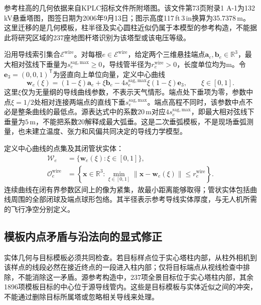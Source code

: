 参考柱高的几何依据来自KPLC招标文件所附塔图\cite{KPLC2025}。该文件第73页附录1 A-1为132\,kV悬垂塔图，图签日期为2006年9月13日；图示高度117\,ft\,3\,in换算为35.7378\,m。这里迁移的是几何模板，柱半径及实心圆柱近似仍属于本模型的参考构造，不能据此将研究区域的237座地图杆塔识别为该塔型或该电压等级。

沿用导线索引集合$\mathcal E^{\mathrm{wire}}$。对每根$e\in\mathcal E^{\mathrm{wire}}$，给定两个三维悬挂端点$\mathbf a_e,\mathbf b_e\in\mathbb R^3$，最大相对弦线下垂量为$s_e^{\mathrm{sag,max}}\ge0$，导线管半径为$r_e^{\mathrm{wire}}>0$，长度单位均为$\mathrm m$。令$\mathbf e_3=(0,0,1)^{\mathsf T}$为竖直向上单位向量，定义中心曲线
\begin{equation}
 \mathbf w_e(\xi)
 =(1-\xi)\mathbf a_e+\xi\mathbf b_e
 -4s_e^{\mathrm{sag,max}}\xi(1-\xi)\mathbf e_3,
 \qquad \xi\in[0,1].
 \label{s0406:wire_curve}
\end{equation}
这里$\xi$仅为无量纲的导线曲线参数，不表示天气情形。端点处下垂项为零，参数中点$\xi=1/2$处相对连接两端点的直线下垂$s_e^{\mathrm{sag,max}}$。端点高程不同时，该参数中点不必是整条曲线的最低点。源表达式中的系数$20\,\mathrm m$对应$4s_e^{\mathrm{sag,max}}$，即最大相对弦线下垂量为$5\,\mathrm m$，不能把系数20解释成最大弧垂。这是二次垂弧模板，不是现场垂弧测量，也未建立温度、张力和风偏共同决定的导线力学模型。

定义中心曲线的点集及其闭管状实体：
\begin{equation}
 \begin{split}
 \mathcal W_e&=\{\mathbf w_e(\xi):\xi\in[0,1]\},\\
 \mathcal O_e^{\mathrm{wire}}
 &=\left\{\mathbf x\in\mathbb R^3:
    \min_{\xi\in[0,1]}\|\mathbf x-\mathbf w_e(\xi)\|
       \le r_e^{\mathrm{wire}}\right\}.
 \end{split}
 \label{s0406:wire_tube}
\end{equation}
连续曲线在闭有界参数区间上的像为紧集，故最小距离能够取得；管状实体包括曲线周围的全部闭球及端点球形包络。其半径表示参考导线实体厚度，与无人机所需的飞行净空分别定义。

\subsection{模板内点矛盾与沿法向的显式修正}

实体几何与目标模板必须共同检查。若目标样点位于实心塔柱内部，从柱外相机到该样点的线段必然在接近终点的一段进入柱内部；仅将目标端点从视线检查中排除，不能消除这一矛盾。源参考构造中，237项全景目标位于实心塔柱内部，其余1896项模板目标的中心位于源导线管内。这些是目标模板与实体近似之间的冲突，不能通过删除目标所属塔或忽略相关导线来处理。

